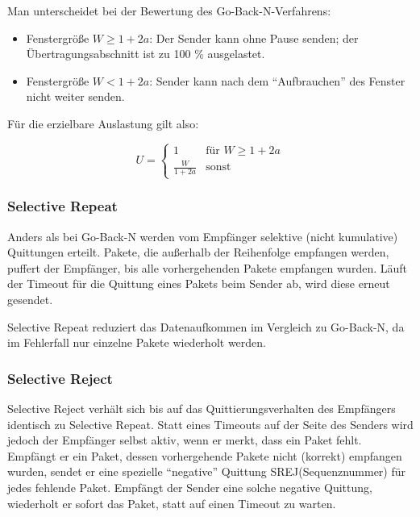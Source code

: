 \documentclass[a4paper, 14pt]{article}
\begin{document}
	Man unterscheidet bei der Bewertung des Go-Back-N-Verfahrens:

	\begin{itemize}
		\item Fenstergröße $W \geq 1 + 2a$: Der Sender kann ohne Pause senden; der Übertragungsabschnitt ist zu 100 \% ausgelastet.
		\item Fenstergröße $W < 1 + 2a$: Sender kann nach dem \enquote{Aufbrauchen} des Fenster nicht weiter senden.
	\end{itemize}

	Für die erzielbare Auslastung gilt also:

	\begin{equation*}
		U = \begin{cases}
			1 & \text{für } W \geq 1 + 2a \\
			\frac{W}{1 + 2a} & \text{sonst}
		\end{cases}
	\end{equation*}

	\subsubsection{Selective Repeat}

	Anders als bei Go-Back-N werden vom Empfänger selektive (nicht kumulative) Quittungen erteilt.
	Pakete, die außerhalb der Reihenfolge empfangen werden, puffert der Empfänger, bis alle vorhergehenden Pakete empfangen wurden.
	Läuft der Timeout für die Quittung eines Pakets beim Sender ab, wird diese erneut gesendet.

	Selective Repeat reduziert das Datenaufkommen im Vergleich zu Go-Back-N, da im Fehlerfall nur einzelne Pakete wiederholt werden.

	\subsubsection{Selective Reject}

	Selective Reject verhält sich bis auf das Quittierungsverhalten des Empfängers identisch zu Selective Repeat.
	Statt eines Timeouts auf der Seite des Senders wird jedoch der Empfänger selbst aktiv, wenn er merkt, dass ein Paket fehlt.
	Empfängt er ein Paket, dessen vorhergehende Pakete nicht (korrekt) empfangen wurden, sendet er eine spezielle \enquote{negative} Quittung SREJ(Sequenznummer) für jedes fehlende Paket.
	Empfängt der Sender eine solche negative Quittung, wiederholt er sofort das Paket, statt auf einen Timeout zu warten.
\end{document}
